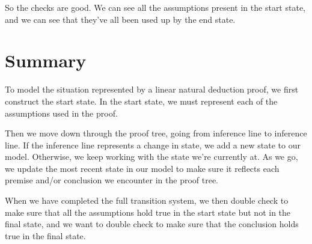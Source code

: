 \documentclass[../../../main.tex]{subfiles}
\begin{document}
\noindent
So the checks are good. We can see all the assumptions present in the start state, and we can see that they've all been used up by the end state.


\section{Summary}

To model the situation represented by a linear natural deduction proof, we first construct the start state. In the start state, we must represent each of the assumptions used in the proof. 

Then we move down through the proof tree, going from inference line to inference line. If the inference line represents a change in state, we add a new state to our model. Otherwise, we keep working with the state we're currently at. As we go, we update the most recent state in our model to make sure it reflects each premise and/or conclusion we encounter in the proof tree.

When we have completed the full transition system, we then double check to make sure that all the assumptions hold true in the start state but not in the final state, and we want to double check to make sure that the conclusion holds true in the final state.
\end{document}
